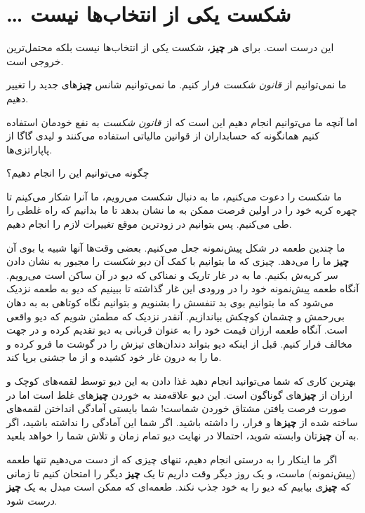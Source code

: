 \section{\ldots{} شکست یکی از انتخاب‌ها
نیست}\label{ux634ux6a9ux633ux62a-ux6ccux6a9ux6cc-ux627ux632-ux627ux646ux62aux62eux627ux628ux647ux627-ux646ux6ccux633ux62a}

این درست است. برای هر \textbf{چیز}، شکست یکی از انتخاب‌ها نیست بلکه
محتمل‌ترین خروجی است.

ما نمی‌توانیم از \emph{قانون شکست} فرار کنیم. ما نمی‌توانیم شانس
\textbf{چیز}های جدید را تغییر دهیم.

اما آنچه ما می‌توانیم انجام دهیم این است که از \emph{قانون شکست} به نفع
خودمان استفاده کنیم همانگونه که حسابداران از قوانین مالیاتی استفاده
می‌کنند و لیدی گاگا از پاپاراتزی‌ها.

چگونه می‌توانیم این را انجام دهیم؟

ما شکست را دعوت می‌کنیم، ما به دنبال شکست می‌رویم، ما آنرا شکار می‌کینم
تا چهره کریه خود را در اولین فرصت ممکن به ما نشان بدهد تا ما بدانیم که
راه غلطی را طی می‌کنیم. پس بتوانیم در زودترین موقع تغییرات لازم را انجام
دهیم.

ما چندین طعمه در شکل پیش‌نمونه جعل می‌کنیم. بعضی وقت‌ها آنها شبیه یا بوی
آن \textbf{چیز} ما را می‌دهد. چیزی که ما بتوانیم با کمک آن \emph{دیو
شکست} را مجبور به نشان دادن سر کریه‌ش بکنیم. ما به در غار تاریک و نمناکی
که دیو در آن ساکن است می‌رویم. آنگاه طعمه پیش‌نمونه خود را در ورودی این
غار گذاشته تا ببینیم که دیو به طعمه نزدیک می‌شود که ما بتوانیم بوی بد
تنفسش را بشنویم و بتوانیم نگاه کوتاهی به به دهان بی‌رحمش و چشمان کوچکش
بیاندازیم. آنقدر نزدیک که مطمئن شویم که دیو واقعی است. آنگاه طعمه ارزان
قیمت خود را به عنوان قربانی به دیو تقدیم کرده و در جهت مخالف فرار کنیم.
قبل از اینکه دیو بتواند دندان‌های تیزش را در گوشت ما فرو کرده و ما را به
درون غار خود کشیده و از ما جشنی برپا کند.

بهترین کاری که شما می‌توانید انجام دهید غذا دادن به این دیو توسط
لقمه‌های کوچک و ارزان از \textbf{چیز}های گوناگون است. این دیو علاقه‌مند
به خوردن \textbf{چیز}های غلط است اما در صورت فرصت یافتن مشتاق خوردن
شماست! شما بایستی آمادگی انداختن لقمه‌های ساخته شده از \textbf{چیز}ها و
فرار، را داشته باشید. اگر شما این آمادگی را نداشته باشید، اگر به آن
\textbf{چیز}تان وابسته شوید، احتمالا در نهایت دیو تمام زمان و تلاش شما
را خواهد بلعید.

اگر ما اینکار را به درستی انجام دهیم، تنهای چیزی که از دست می‌دهیم تنها
طعمه (پیش‌نمونه) ماست، و یک روز دیگر وقت داریم تا یک \textbf{چیز} دیگر
را امتحان کنیم تا زمانی که \textbf{چیز}ی بیابیم که دیو را به خود جذب
نکند. طعمه‌ای که ممکن است مبدل به یک \textbf{چیز} \emph{درست} شود.

